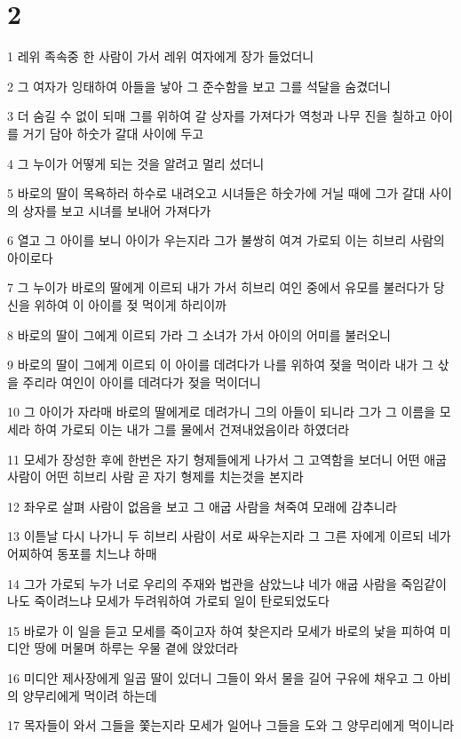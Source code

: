 \chapter{2}

\par 1 레위 족속중 한 사람이 가서 레위 여자에게 장가 들었더니
\par 2 그 여자가 잉태하여 아들을 낳아 그 준수함을 보고 그를 석달을 숨겼더니
\par 3 더 숨길 수 없이 되매 그를 위하여 갈 상자를 가져다가 역청과 나무 진을 칠하고 아이를 거기 담아 하숫가 갈대 사이에 두고
\par 4 그 누이가 어떻게 되는 것을 알려고 멀리 섰더니
\par 5 바로의 딸이 목욕하러 하수로 내려오고 시녀들은 하숫가에 거닐 때에 그가 갈대 사이의 상자를 보고 시녀를 보내어 가져다가
\par 6 열고 그 아이를 보니 아이가 우는지라 그가 불쌍히 여겨 가로되 이는 히브리 사람의 아이로다
\par 7 그 누이가 바로의 딸에게 이르되 내가 가서 히브리 여인 중에서 유모를 불러다가 당신을 위하여 이 아이를 젖 먹이게 하리이까
\par 8 바로의 딸이 그에게 이르되 가라 그 소녀가 가서 아이의 어미를 불러오니
\par 9 바로의 딸이 그에게 이르되 이 아이를 데려다가 나를 위하여 젖을 먹이라 내가 그 삯을 주리라 여인이 아이를 데려다가 젖을 먹이더니
\par 10 그 아이가 자라매 바로의 딸에게로 데려가니 그의 아들이 되니라 그가 그 이름을 모세라 하여 가로되 이는 내가 그를 물에서 건져내었음이라 하였더라
\par 11 모세가 장성한 후에 한번은 자기 형제들에게 나가서 그 고역함을 보더니 어떤 애굽 사람이 어떤 히브리 사람 곧 자기 형제를 치는것을 본지라
\par 12 좌우로 살펴 사람이 없음을 보고 그 애굽 사람을 쳐죽여 모래에 감추니라
\par 13 이튿날 다시 나가니 두 히브리 사람이 서로 싸우는지라 그 그른 자에게 이르되 네가 어찌하여 동포를 치느냐 하매
\par 14 그가 가로되 누가 너로 우리의 주재와 법관을 삼았느냐 네가 애굽 사람을 죽임같이 나도 죽이려느냐 모세가 두려워하여 가로되 일이 탄로되었도다
\par 15 바로가 이 일을 듣고 모세를 죽이고자 하여 찾은지라 모세가 바로의 낯을 피하여 미디안 땅에 머물며 하루는 우물 곁에 앉았더라
\par 16 미디안 제사장에게 일곱 딸이 있더니 그들이 와서 물을 길어 구유에 채우고 그 아비의 양무리에게 먹이려 하는데
\par 17 목자들이 와서 그들을 쫓는지라 모세가 일어나 그들을 도와 그 양무리에게 먹이니라

